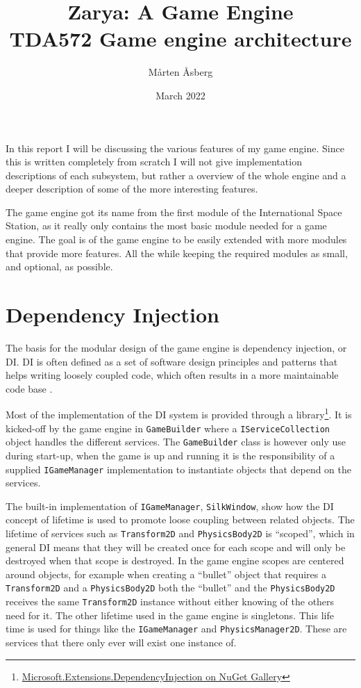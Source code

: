\documentclass{article}
\title{
	Zarya: A Game Engine \\
	\large{TDA572 Game engine architecture}
}
\author{Mårten Åsberg}
\date{March 2022}
\newcommand{\zarya}{the game engine}
\newcommand{\Zarya}{The game engine}
\begin{document}
\maketitle

In this report I will be discussing the various features of my game engine.
Since this is written completely from scratch I will not give implementation descriptions of each subsystem, but rather a overview of the whole engine and a deeper description of some of the more interesting features.

\Zarya{} got its name from the first module of the International Space Station\cite{NASA99}, as it really only contains the most basic module needed for a game engine.
The goal is of \zarya{} to be easily extended with more modules that provide more features.
All the while keeping the required modules as small, and optional, as possible.

\section*{Dependency Injection}

The basis for the modular design of \zarya{} is dependency injection, or DI.
DI is often defined as a set of software design principles and patterns that helps writing loosely coupled code, which often results in a more maintainable code base \cite{DI18}.

Most of the implementation of the DI system is provided through a library\footnote{\href{https://www.nuget.org/packages/Microsoft.Extensions.DependencyInjection}{Microsoft.Extensions.DependencyInjection on NuGet Gallery}}.
It is kicked-off by \zarya{} in \texttt{GameBuilder} where a \texttt{IServiceCollection} object handles the different services.
The \texttt{GameBuilder} class is however only use during start-up, when the game is up and running it is the responsibility of a supplied \texttt{IGameManager} implementation to instantiate objects that depend on the services.

The built-in implementation of \texttt{IGameManager}, \texttt{SilkWindow}, show how the DI concept of lifetime is used to promote loose coupling between related objects.
The lifetime of services such as \texttt{Transform2D} and \texttt{PhysicsBody2D} is ``scoped'', which in general DI means that they will be created once for each scope and will only be destroyed when that scope is destroyed.
In \zarya{} scopes are centered around objects, for example when creating a ``bullet'' object that requires a \texttt{Transform2D} and a \texttt{PhysicsBody2D} both the ``bullet'' and the \texttt{PhysicsBody2D} receives the same \texttt{Transform2D} instance without either knowing of the others need for it.
The other lifetime used in \zarya{} is singletons. This life time is used for things like the \texttt{IGameManager} and \texttt{PhysicsManager2D}. These are services that there only ever will exist one instance of.
\end{document}

